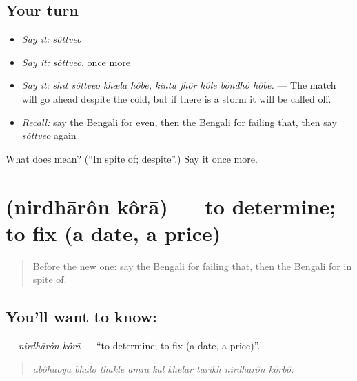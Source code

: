 \subsection*{Your turn}
\begin{itemize}
\raggedright
  \item \emph{Say it:} \emph{sôttveo}
  \item \emph{Say it:} \emph{sôttveo}, once more
  \item \emph{Say it:} \emph{shīt sôttveo khælā hôbe, kintu jhôṛ hôle bôndhô hôbe.} — The match will go ahead despite the cold, but if there is a storm it will be called off.
  \item \emph{Recall:} say the Bengali for even, then the Bengali for failing that, then say \emph{sôttveo} again
\end{itemize}

\begin{tcolorbox}[breakable,colback=teal!4,colframe=teal!35!black,title={Before you move on}]
What does  mean? (\textquotedblleft{}In spite of; despite\textquotedblright{}.) Say it once more.
\end{tcolorbox}
\section[\texorpdfstring{\bn{নির্ধারণ} \bn{করা} (nirdhārôn kôrā)}{নির্ধারণ করা (nirdhārôn kôrā)}]{  (nirdhārôn kôrā) — to determine; to fix (a date, a price)}

\label{lesson:BN-C369-nirdharon-kora}



\begin{quote}
Before the new one: say the Bengali for failing that, then the Bengali for in spite of.
\end{quote}

\subsection*{You'll want to know:  }
\textbf{ } — \emph{nirdhārôn kôrā} — \textquotedblleft{}to determine; to fix (a date, a price)\textquotedblright{}.

\begin{quote}
        
\end{quote}

\begin{quote}
\emph{ābôhāoyā bhālo thākle āmrā kāl khelār tārikh nirdhārôn kôrbô.}
\end{quote}

